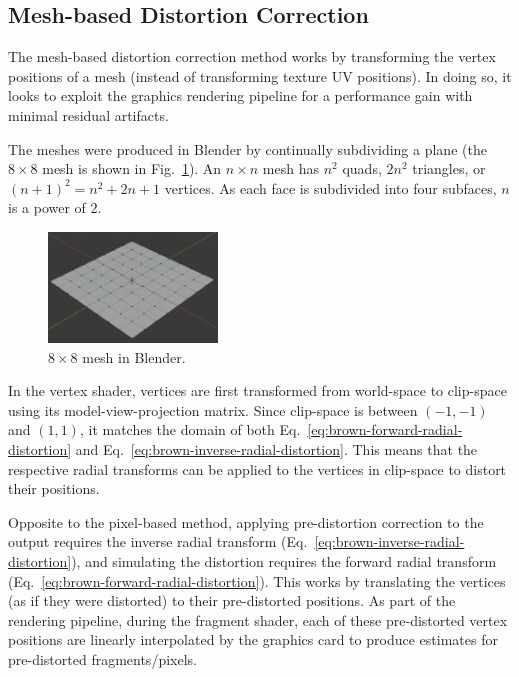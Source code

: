 \subsection{Mesh-based Distortion Correction}\label{sec:mesh-based}

The mesh-based distortion correction method works by transforming the vertex positions of a mesh (instead of transforming texture UV positions).
In doing so, it looks to exploit the graphics rendering pipeline for a performance gain with minimal residual artifacts.

The meshes were produced in Blender by continually subdividing a plane (the $8 \times 8$ mesh is shown in Fig.~\ref{fig:blender-mesh8}).
An $n \times n$ mesh has $n^2$ quads, $2n^2$ triangles, or $(n + 1)^2 = n^2 + 2n + 1$ vertices.
As each face is subdivided into four subfaces, $n$ is a power of $2$.

\begin{figure}[ht]
    \centering
    \includegraphics[width=0.4\textwidth]{figures/blender-mesh8}
    \caption{$8 \times 8$ mesh in Blender.}
    \label{fig:blender-mesh8}
\end{figure}

In the vertex shader, vertices are first transformed from world-space to clip-space using its model-view-projection matrix.
Since clip-space is between $(-1, -1)$ and $(1, 1)$, it matches the domain of both Eq.~\ref{eq:brown-forward-radial-distortion} and Eq.~\ref{eq:brown-inverse-radial-distortion}.
This means that the respective radial transforms can be applied to the vertices in clip-space to distort their positions.

Opposite to the pixel-based method, applying pre-distortion correction to the output requires the inverse radial transform (Eq.~\ref{eq:brown-inverse-radial-distortion}), and simulating the distortion requires the forward radial transform (Eq.~\ref{eq:brown-forward-radial-distortion}).
This works by translating the vertices (as if they were distorted) to their pre-distorted positions.
As part of the rendering pipeline, during the fragment shader, each of these pre-distorted vertex positions are linearly interpolated by the graphics card to produce estimates for pre-distorted fragments/pixels.

